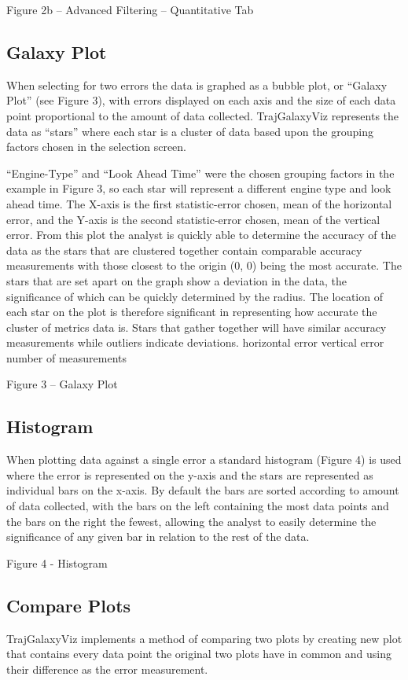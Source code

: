 \documentclass[]{article}
\begin{document}
Figure 2b – Advanced Filtering – Quantitative Tab


\subsection{Galaxy Plot}
\label{galaxyPlot}
When selecting for two errors the data is graphed as a bubble plot, or “Galaxy Plot” (see Figure 3), with errors displayed on each axis and the size of each data point proportional to the amount of data collected. TrajGalaxyViz represents the data as “stars” where each star is a cluster of data based upon the grouping factors chosen in the selection screen.

“Engine-Type” and “Look Ahead Time” were the chosen grouping factors in the example in Figure 3, so each star will represent a different engine type and look ahead time. The X-axis is the first statistic-error chosen, mean of the horizontal error, and the Y-axis is the second statistic-error chosen, mean of the vertical error. From this plot the analyst is quickly able to determine the accuracy of the data as the stars that are clustered together contain comparable accuracy measurements with those closest to the origin (0, 0) being the most accurate. The stars that are set apart on the graph show a deviation in the data, the significance of which can be quickly determined by the radius. The location of each star on the plot is therefore significant in representing how accurate the cluster of metrics data is. Stars that gather together will have similar accuracy measurements while outliers indicate deviations.
horizontal error
vertical error
number of measurements

Figure 3 – Galaxy Plot


\subsection{Histogram}
\label{histogram}
When plotting data against a single error a standard histogram (Figure 4) is used where the error is represented on the y-axis and the stars are represented as individual bars on the x-axis. By default the bars are sorted according to amount of data collected, with the bars on the left containing the most data points and the bars on the right the fewest, allowing the analyst to easily determine the significance of any given bar in relation to the rest of the data.


Figure 4 - Histogram


\subsection{Compare Plots}
\label{comparePlots}
TrajGalaxyViz implements a method of comparing two plots by creating new plot that contains every data point the original two plots have in common and using their difference as the error measurement.
\end{document}
